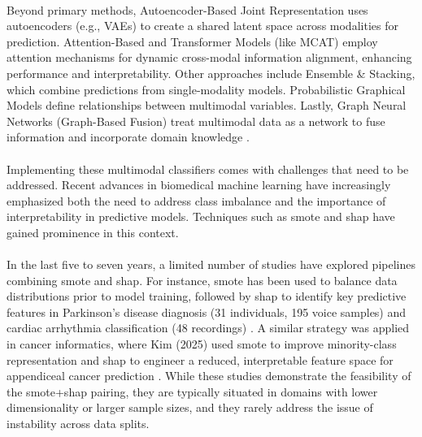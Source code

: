 \documentclass[12pt,a4paper]{report}
\begin{document}
\\
Beyond primary methods, Autoencoder-Based Joint Representation uses autoencoders (e.g., VAEs) to create a shared latent space across modalities for prediction. Attention-Based and Transformer Models (like MCAT) employ attention mechanisms for dynamic cross-modal information alignment, enhancing performance and interpretability. Other approaches include Ensemble \& Stacking, which combine predictions from single-modality models. Probabilistic Graphical Models define relationships between multimodal variables. Lastly, Graph Neural Networks (Graph-Based Fusion) treat multimodal data as a network to fuse information and incorporate domain knowledge \cite{Qoku2023Multimodal}.\\
\\
Implementing these multimodal classifiers comes with challenges that need to be addressed. Recent advances in biomedical machine learning have increasingly emphasized both the need to address class imbalance and the importance of interpretability in predictive models. Techniques such as \acrfull{smote} and \acrfull{shap} have gained prominence in this context.\\
\\
In the last five to seven years, a limited number of studies have explored pipelines combining \acrshort{smote} and \acrshort{shap}. For instance, \acrshort{smote} has been used to balance data distributions prior to model training, followed by \acrshort{shap} to identify key predictive features in Parkinson’s disease diagnosis (31 individuals, 195 voice samples) and cardiac arrhythmia classification (48 recordings) \cite{sofi2025parkinsons, xiao2024interpretable}. A similar strategy was applied in cancer informatics, where Kim (2025) used \acrshort{smote} to improve minority-class representation and \acrshort{shap} to engineer a reduced, interpretable feature space for appendiceal cancer prediction \cite{kim2025shap}. While these studies demonstrate the feasibility of the \acrshort{smote}+\acrshort{shap} pairing, they are typically situated in domains with lower dimensionality or larger sample sizes, and they rarely address the issue of instability across data splits.\\
\\
\end{document}
